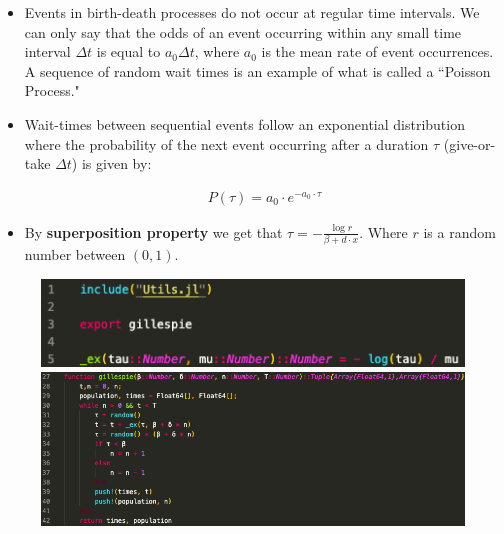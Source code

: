\documentclass[10pt, usenames, dvipsnames, xcolor=table]{beamer}
\begin{document}
\begin{frame}
\begin{itemize}
\item Events in birth-death processes do not occur at regular time intervals. We can only say that the odds of an event occurring within any small time interval $\Delta t$ is equal to $a_{0} \Delta t$, where $a_0$ is the mean rate of event occurrences. A sequence of random wait times is an example of what is called a ``Poisson Process."

\item Wait-times between sequential events follow an exponential distribution where the probability of the next event occurring after a duration $\tau$ (give-or-take $\Delta t$) is given by:

\begin{align*}
P(\tau) = a_{0} \cdot e^{-a_0 \cdot \tau}
\end{align*}

\item By \textbf{superposition property} we get that $\tau = - \frac{\log{r}}{\beta + d\cdot x}$. Where $r$ is a random number between $(0,1)$.
\end{itemize}
\end{frame}

\begin{frame}[fragile]
\begin{figure}[h]
\includegraphics[width=12cm]{code1}
\vspace{1cm}
\includegraphics[width=12cm]{code2}
\end{figure}
\end{frame}
\end{document}
